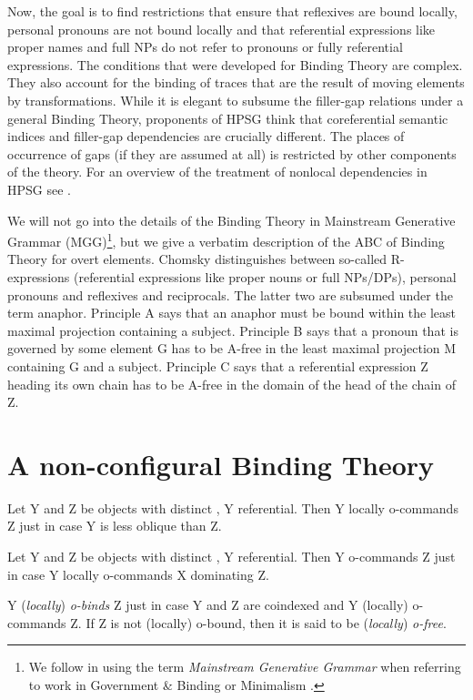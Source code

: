 \documentclass[output=paper
                ,modfonts
                ,nonflat
	        ,collection
	        ,collectionchapter
	        ,collectiontoclongg
 	        ,biblatex
                ,babelshorthands
                ,newtxmath
                ,draftmode
                ,colorlinks, citecolor=brown
]{./langsci/langscibook}
\begin{document}
Now, the goal is to find restrictions that ensure that reflexives are bound locally, personal
pronouns are not bound locally and that referential expressions like proper names and full NPs do
not refer to pronouns or fully referential expressions. The conditions that were developed for
Binding Theory are complex. They also account for the binding of traces that are the result of
moving elements by transformations. While it is elegant to subsume the filler-gap relations under a
general Binding Theory, proponents of HPSG think that coreferential semantic indices and filler-gap
dependencies are crucially different. The places of occurrence of gaps (if they are assumed at all)
is restricted by other components of the theory. For an overview of the treatment of nonlocal
dependencies in HPSG see .

We will not go into the details of the Binding Theory in Mainstream Generative Grammar
(MGG)\footnote{
We follow \citet[]{CJ2005a} in using the term \emph{Mainstream Generative Grammar} when
referring to work in Government \& Binding \citep{Chomsky81a} or Minimalism \citep{Chomsky95a-u}.}, but we
give a verbatim description of the ABC of Binding Theory for overt elements. Chomsky distinguishes between
so-called R-expressions (referential expressions like proper nouns or full NPs/DPs), personal
pronouns and reflexives and reciprocals. The latter two are subsumed under the term anaphor. 
Principle A says that an anaphor must be bound within the least maximal projection containing a
subject. Principle B says that a pronoun that is governed by some element G has to be A-free in the
least maximal projection M containing G and a subject. Principle C says that a referential
expression Z heading its own chain has to be A-free in the domain of the head of the chain of Z.


\section{A non-configural Binding Theory}


\ea
Let Y and Z be  objects with distinct \localvs, Y referential. Then Y locally
o-commands Z just in case Y is less oblique than Z.
\z

\ea
Let Y and Z be  objects with distinct \localvs, Y referential. Then Y o-commands Z just
in case Y locally o-commands X dominating Z.
\z

\ea
Y (\emph{locally}) \emph{o-binds} Z just in case Y and Z are coindexed and Y (locally) o-commands Z. If Z
is not (locally) o-bound, then it is said to be (\emph{locally}) \emph{o-free}.
\z
\end{document}
